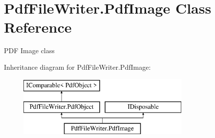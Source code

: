 \hypertarget{class_pdf_file_writer_1_1_pdf_image}{}\section{Pdf\+File\+Writer.\+Pdf\+Image Class Reference}
\label{class_pdf_file_writer_1_1_pdf_image}


P\+DF Image class  


Inheritance diagram for Pdf\+File\+Writer.\+Pdf\+Image\+:\begin{figure}[H]
\begin{center}
\leavevmode
\includegraphics[height=3.000000cm]{class_pdf_file_writer_1_1_pdf_image}
\end{center}
\end{figure}

